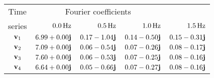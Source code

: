 \begin{tabular}{crrrr}
    \toprule
    Time    & \multicolumn{3}{c}{Fourier coefficients} \\
    series  & $\unit[0.0]{Hz}$ & $\unit[0.5]{Hz}$ & $\unit[1.0]{Hz}$ & $\unit[1.5]{Hz}$ \\\otoprule
    $\textbf{v}_{1}$ & $6.99+0.00\textbf{j}$ & $0.17-1.04\textbf{j}$ & $0.14-0.50\textbf{j}$ & $0.15-0.31\textbf{j}$ \\
    $\textbf{v}_{2}$ & $7.09+0.00\textbf{j}$ & $0.06-0.54\textbf{j}$ & $0.07-0.26\textbf{j}$ & $0.08-0.17\textbf{j}$ \\
    $\textbf{v}_{3}$ & $7.60+0.00\textbf{j}$ & $0.06-0.53\textbf{j}$ & $0.07-0.25\textbf{j}$ & $0.08-0.16\textbf{j}$ \\
    $\textbf{v}_{4}$ & $6.64+0.00\textbf{j}$ & $0.05-0.66\textbf{j}$ & $0.07-0.27\textbf{j}$ & $0.08-0.16\textbf{j}$ \\
    \bottomrule
\end{tabular}
